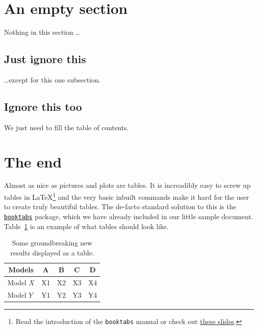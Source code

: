 \documentclass[12pt, a4paper]{article}
\begin{document}
\section{An empty section} \label{sec:empty}

Nothing in this section \dots

\subsection{Just ignore this} \label{subsec:ignore}

\dots except for this one subsection.

\subsection{Ignore this too} \label{subsec:ignoretoo}

We just need to fill the table of contents.

\section{The end} \label{sec:end}

Almost as nice as pictures and plots are tables. It is increadibly easy to screw
up tables in \LaTeX{}\footnote{Read the introduction of the \texttt{booktabs}
manual or check out
\href{https://www.inf.ethz.ch/personal/markusp/teaching/guides/guide-tables.pdf}
{these slides}.} and the very basic inbuilt commands make it hard for the user
to create truly beautiful tables. The de-facto standard solution to this is the
\href{https://www.ctan.org/pkg/booktabs}{\texttt{booktabs}} package, which we
have already included in our little sample document. Table~\ref{tab:sample} is
an example of what tables should look like.

\begin{table}
\begin{center}
    \begin{tabular}{@{} l *4c @{}}
    \toprule
    \multicolumn{1}{c}{Models}    & A  & B  & C  & D  \\
    \midrule
    Model $X$ & X1 & X2 & X3 & X4 \\
    Model $Y$ & Y1 & Y2 & Y3 & Y4 \\
    \bottomrule
    \end{tabular}
  \end{center}
  \caption{Some groundbreaking new results displayed as a table.
  \label{tab:sample}}
\end{table}

\end{document}
